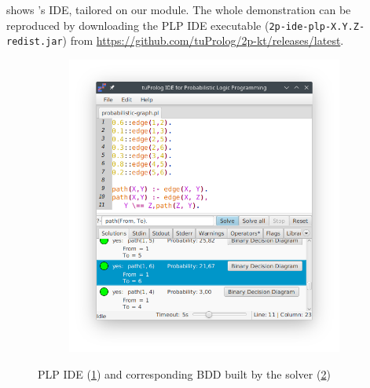 \documentclass[12pt,a4paper,openright,twoside]{book}
\begin{document}
 shows \twopkt{}'s IDE, tailored on our \problog{} module.
%
The whole demonstration can be reproduced by downloading the PLP IDE executable (\texttt{2p-ide-\allowbreak{}plp-X.Y.Z-redist.jar}) from \url{https://github.com/tuProlog/2p-kt/releases/latest}.
%
\begin{figure}[t]
    \centering
    \begin{subfigure}{0.4\linewidth}
        \caption{}
        \label{fig:problog-ide:screenshot}
        \includegraphics[width=\linewidth]{figures/valid-ide-screenshot.png}
    \end{subfigure}
    \hfill
    \begin{subfigure}{0.59\linewidth}
        \caption{}
        \label{fig:problog-ide:graph}
    \end{subfigure}
    \caption[\twopkt{} PLP IDE and corresponding BDD built by the solver]{\twopkt{} PLP IDE (\ref{fig:problog-ide:screenshot}) and corresponding BDD built by the solver (\ref{fig:problog-ide:graph})}
    \label{fig:problog-ide}
\end{figure}
\end{document}
